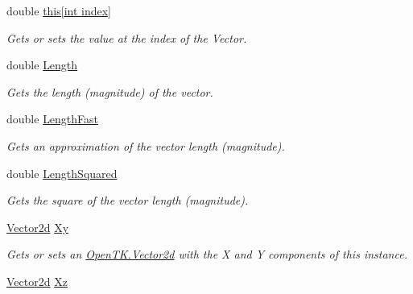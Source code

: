 \begin{DoxyCompactItemize}
\item 
double \hyperlink{struct_open_t_k_1_1_vector3d_a0052ef76359efe834947565dcabe91fc}{this\mbox{[}int index\mbox{]}}
\begin{DoxyCompactList}\small\item\em Gets or sets the value at the index of the Vector. \end{DoxyCompactList}\item 
double \hyperlink{struct_open_t_k_1_1_vector3d_a554332540dcf9bac5720fdb26d5e96c2}{Length}
\begin{DoxyCompactList}\small\item\em Gets the length (magnitude) of the vector. \end{DoxyCompactList}\item 
double \hyperlink{struct_open_t_k_1_1_vector3d_ae08ae4196dadb5dfb4baf0ab27b1ee57}{Length\-Fast}
\begin{DoxyCompactList}\small\item\em Gets an approximation of the vector length (magnitude). \end{DoxyCompactList}\item 
double \hyperlink{struct_open_t_k_1_1_vector3d_aaad32d6807957c3db9e5d32f00571e70}{Length\-Squared}
\begin{DoxyCompactList}\small\item\em Gets the square of the vector length (magnitude). \end{DoxyCompactList}\item 
\hyperlink{struct_open_t_k_1_1_vector2d}{Vector2d} \hyperlink{struct_open_t_k_1_1_vector3d_ae67054daed5a4c1e080b1550d4022276}{Xy}
\begin{DoxyCompactList}\small\item\em Gets or sets an \hyperlink{struct_open_t_k_1_1_vector2d}{Open\-T\-K.\-Vector2d} with the X and Y components of this instance. \end{DoxyCompactList}\item 
\hyperlink{struct_open_t_k_1_1_vector2d}{Vector2d} \hyperlink{struct_open_t_k_1_1_vector3d_a7072875ab2d574f202617f985311cd0d}{Xz}

\end{DoxyCompactItemize}
